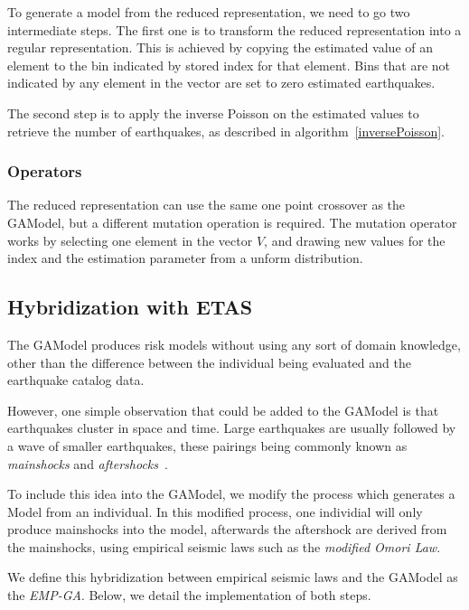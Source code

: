 To generate a model from the reduced representation, we need to go two
intermediate steps. The first one is to transform the reduced
representation into a regular representation. This is achieved by
copying the estimated value of an element to the bin indicated by
stored index for that element. Bins that are not indicated by any
element in the vector are set to zero estimated earthquakes.

The second step is to apply the inverse Poisson on the estimated
values to retrieve the number of earthquakes, as described in
algorithm~\ref{inversePoisson}.

\subsubsection*{Operators}

The reduced representation can use the same one point crossover as the
GAModel, but a different mutation operation is required. The mutation
operator works by selecting one element in the vector $V$, and drawing
new values for the index and the estimation parameter from a unform
distribution.


\subsection{Hybridization with ETAS}

The GAModel produces risk models without using any sort of domain
knowledge, other than the difference between the individual being
evaluated and the earthquake catalog data.

However, one simple observation that could be added to the GAModel is
that earthquakes cluster in space and time. Large earthquakes are
usually followed by a wave of smaller earthquakes, these pairings
being commonly known as \emph{mainshocks} and
\emph{aftershocks}~\cite{schorlemmer2010first}.

To include this idea into the GAModel, we modify the process which
generates a Model from an individual. In this modified process, one
individial will only produce mainshocks into the model, afterwards the
aftershock are derived from the mainshocks, using empirical seismic laws
such as the \emph{modified Omori Law}.

We define this hybridization between empirical seismic laws and the
GAModel as the \emph{EMP-GA}. Below, we detail the implementation of
both steps.

